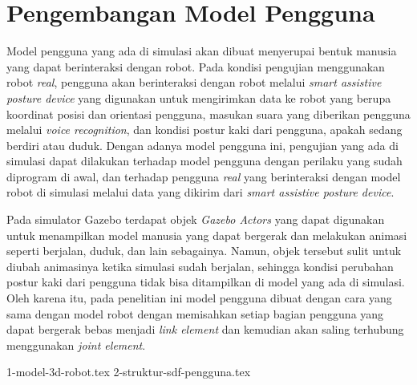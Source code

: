 \section{Pengembangan Model Pengguna}
\label{sec:modelpengguna}

Model pengguna yang ada di simulasi akan dibuat menyerupai bentuk manusia yang dapat berinteraksi dengan robot.
Pada kondisi pengujian menggunakan robot \emph{real},
  pengguna akan berinteraksi dengan robot melalui \emph{smart assistive posture device} yang digunakan untuk mengirimkan data ke robot yang berupa koordinat posisi dan orientasi pengguna,
  masukan suara yang diberikan pengguna melalui \emph{voice recognition},
  dan kondisi postur kaki dari pengguna, apakah sedang berdiri atau duduk.
Dengan adanya model pengguna ini,
  pengujian yang ada di simulasi dapat dilakukan terhadap model pengguna dengan perilaku yang sudah diprogram di awal,
  dan terhadap pengguna \emph{real} yang berinteraksi dengan model robot di simulasi melalui data yang dikirim dari \emph{smart assistive posture device}.

Pada simulator Gazebo terdapat objek \emph{Gazebo Actors} yang dapat digunakan untuk menampilkan model manusia yang dapat bergerak dan melakukan animasi seperti berjalan, duduk, dan lain sebagainya.
Namun, objek tersebut sulit untuk diubah animasinya ketika simulasi sudah berjalan,
  sehingga kondisi perubahan postur kaki dari pengguna tidak bisa ditampilkan di model yang ada di simulasi.
Oleh karena itu, pada penelitian ini model pengguna dibuat dengan cara yang sama dengan model robot dengan memisahkan setiap bagian pengguna yang dapat bergerak bebas menjadi \emph{link element} dan kemudian akan saling terhubung menggunakan \emph{joint element}.

{1-model-3d-robot.tex}
{2-struktur-sdf-pengguna.tex}
